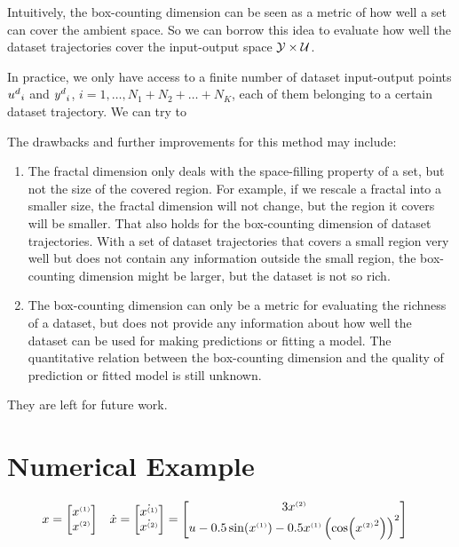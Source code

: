 Intuitively, the box-counting dimension can be seen as a metric of how well a set can cover the ambient space.
So we can borrow this idea to evaluate how well the dataset trajectories cover the input-output space $\mathcal{Y} \times \mathcal{U}$.

In practice, we only have access to a finite number of dataset input-output points ${u^d}_i$ and ${y^d}_i$, $i = 1, \ldots, N_1+N_2+\dots+N_K$, each of them belonging to a certain dataset trajectory.
We can try to 

The drawbacks and further improvements for this method may include:

\begin{enumerate}
    \item The fractal dimension only deals with the space-filling property of a set, but not the size of the covered region.
    For example, if we rescale a fractal into a smaller size, the fractal dimension will not change, but the region it covers will be smaller.
    That also holds for the box-counting dimension of dataset trajectories.
    With a set of dataset trajectories that covers a small region very well but does not contain any information outside the small region, the box-counting dimension might be larger, but the dataset is not so rich.
    \item The box-counting dimension can only be a metric for evaluating the richness of a dataset, but does not provide any information about how well the dataset can be used for making predictions or fitting a model.
    The quantitative relation between the box-counting dimension and the quality of prediction or fitted model is still unknown.
\end{enumerate}

They are left for future work.


\section{Numerical Example}\label{sec:non-linear-system-numerical-example}

\begin{align}
    x = \begin{bmatrix}
        {x^{\scriptscriptstyle{(1)}}} \\
        {x^{\scriptscriptstyle{(2)}}}
    \end{bmatrix} \quad &
    \dot{x} = \begin{bmatrix}
        \dot{{x^{\scriptscriptstyle{(1)}}}} \\
        \dot{{x^{\scriptscriptstyle{(2)}}}}
    \end{bmatrix} = \begin{bmatrix}
        3 {x^{\scriptscriptstyle{(2)}}} \\
        u - 0.5 \sin({x^{\scriptscriptstyle{(1)}}}) - 0.5 {x^{\scriptscriptstyle{(1)}}} \left(\cos({x^{\scriptscriptstyle{(2)}}}^2)\right)^2
    \end{bmatrix}
\end{align}
